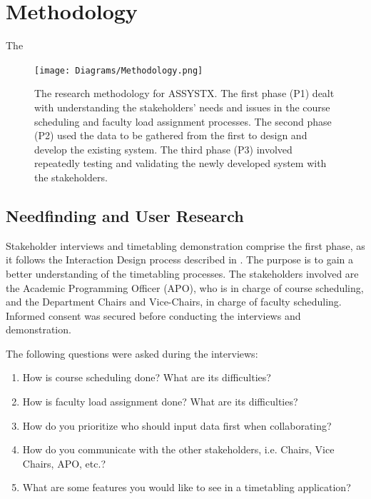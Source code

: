 
\section{Methodology}
The 
\begin{figure}[h]
   \centering
   \texttt{[image: Diagrams/Methodology.png]}
   \caption{The research methodology for ASSYSTX. The first phase (P1) dealt with understanding the stakeholders' needs and issues in the course scheduling and faculty load assignment processes. The second phase (P2) used the data to be gathered from the first to design and develop the existing system. The third phase (P3) involved repeatedly testing and validating the newly developed system with the stakeholders.}
    \label{fig:pipelinediagram}
\end{figure}


\subsection{Needfinding and User Research}
Stakeholder interviews and timetabling demonstration comprise the first phase, as it follows the Interaction Design process described in \cite{Dix:2003:HI:1203012}. The purpose is to gain a better understanding of the timetabling processes. The stakeholders involved are the Academic Programming Officer (APO), who is in charge of course scheduling, and the Department Chairs and Vice-Chairs, in charge of faculty scheduling. Informed consent was secured before conducting the interviews and demonstration.

The following questions were asked during the interviews:
\begin{enumerate}
    \item How is course scheduling done? What are its difficulties?
    \item How is faculty load assignment done? What are its difficulties?
    \item How do you prioritize who should input data first when collaborating?
    \item How do you communicate with the other stakeholders, i.e. Chairs, Vice Chairs, APO, etc.?
    \item What are some features you would like to see in a timetabling application?
\end{enumerate}

